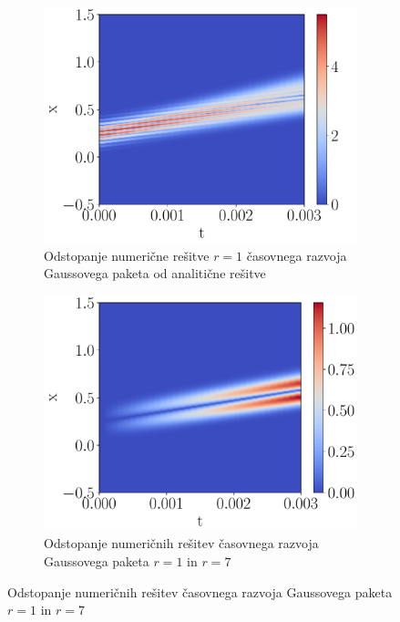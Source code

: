 \documentclass{article}
\begin{document}
\begin{figure}[H]
    \centering
    \begin{subfigure}{0.45\textwidth}
        \centering
        \includegraphics[width=\linewidth]{diff1.pdf}
		\caption{Odstopanje numerične rešitve $r=1$ časovnega razvoja Gaussovega paketa od analitične rešitve}
    \end{subfigure}
    \hfill
    \begin{subfigure}{0.45\textwidth}
        \centering
        \includegraphics[width=\linewidth]{diff7.pdf}
        \caption{Odstopanje numeričnih rešitev časovnega razvoja Gaussovega paketa $r=1$ in $r=7$}
    \end{subfigure}
\end{figure}
\end{document}
